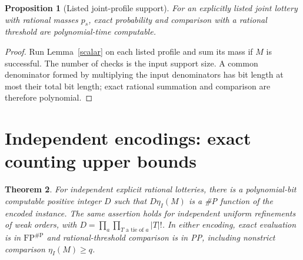 \documentclass[11pt]{article}
\newtheorem{theorem}{Theorem}
\newtheorem{proposition}[theorem]{Proposition}
\theoremstyle{remark}
\begin{document}
\begin{proposition}[Listed joint-profile support]
For an explicitly listed joint lottery with rational masses $p_s$, exact probability and comparison with a rational threshold are polynomial-time computable.
\end{proposition}
\begin{proof}
Run Lemma~\ref{scalar} on each listed profile and sum its mass if $M$ is successful. The number of checks is the input support size. A common denominator formed by multiplying the input denominators has bit length at most their total bit length; exact rational summation and comparison are therefore polynomial.
\end{proof}

\section{Independent encodings: exact counting upper bounds}
\begin{theorem}\label{count}
For independent explicit rational lotteries, there is a polynomial-bit computable positive integer $D$ such that $D\eta_I(M)$ is a \#P function of the encoded instance. The same assertion holds for independent uniform refinements of weak orders, with
$D=\prod_{a}\prod_{T\text{ a tie of }a}|T|!$.
In either encoding, exact evaluation is in $\mathrm{FP}^{\#\mathrm P}$ and rational-threshold comparison is in PP, including nonstrict comparison $\eta_I(M)\geq q$.
\end{theorem}
\end{document}
